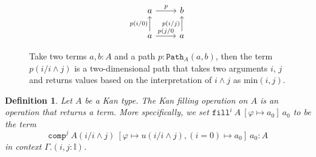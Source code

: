 \documentclass[12pt,a4paper,twoside,xetex,draft]{book}
\newcommand{\keyword}[1]{\emph{#1}\index{#1}}
\newtheorem{definition}[theorem]{Definition}
\newcommand{\op}[1]{\mathtt{#1}}
\newcommand{\pa}[3]{\op{Path}_{#1}\left(#2, #3\right)}
\newcommand{\fillt}[5]{\op{fill}^{#1} \ {#2} \ \left[{#3} \mapsto {#5} \right] \ {#5}}
\begin{document}

% 
% 
%  
% 
%  
%  

% 
% 
% 
% 



\begin{figure}
\centering
\[ \begin{tikzcd}
a \arrow[r, "p" ] 
& b  \\
a 	\arrow[u, "p(i/0)"]	
	\arrow[r, "p(j/0"]
& a  \arrow[u, "p(i/j)"] 
\end{tikzcd}
\]
\caption{Take two terms $a,b:A$ and a path $p : \pa{A}{a}{b}$, then the term $p(i/i\wedge j)$ is a two-dimensional path that takes two arguments $i$, $j$ and returns values based on the interpretation of $i \wedge j$ as $\text{min}(i,j)$.}
\end{figure}


\begin{definition}\label{filldef}
Let $A$ be a Kan type. The Kan \keyword{filling} operation on $A$ is an operation that returns a term. More specifically, we set $\fillt{i}{A}{\varphi}{u}{a_0}$ to be the term $$\op{comp}^j \ A(i/i \wedge j) \ \left[\varphi \mapsto u(i/i \wedge j), (i=0) \mapsto a_0 \right] \ a_0 : A $$ in context $\Gamma . (i, j: \mathbb{I})$.
\end{definition}
\end{document}
